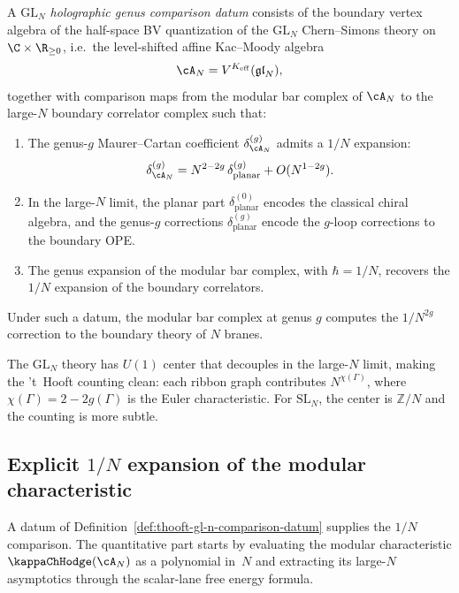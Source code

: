 \begin{definition}%
\label{def:thooft-gl-n-comparison-datum}

A \emph{$\mathrm{GL}_N$ holographic genus comparison datum} consists
of the boundary vertex algebra of the half-space BV
quantization of the $\mathrm{GL}_N$ Chern--Simons theory on
$\C \times \R_{\ge 0}$, i.e.\ the level-shifted affine Kac--Moody
algebra
\[
\cA_N=V^{K_{\mathrm{eff}}}(\mathfrak{gl}_N),
\]
together with comparison maps from the modular bar complex of $\cA_N$
to the large-$N$ boundary correlator complex such that:
\begin{enumerate}[label=\textup{(\alph*)}]
\item The genus-$g$ Maurer--Cartan coefficient
 $\delta_{\cA_N}^{(g)}$ admits a $1/N$ expansion:
 \[
 \delta_{\cA_N}^{(g)} = N^{2-2g}\, \delta_{\mathrm{planar}}^{(g)}
 + O(N^{1-2g}).
 \]
\item In the large-$N$ limit, the planar part
 $\delta_{\mathrm{planar}}^{(0)}$ encodes the classical
 chiral algebra, and the genus-$g$ corrections
 $\delta_{\mathrm{planar}}^{(g)}$ encode the $g$-loop
 corrections to the boundary OPE.
\item The genus expansion of the modular bar complex, with
 $\hbar = 1/N$, recovers the $1/N$ expansion of the boundary
 correlators.
\end{enumerate}
Under such a datum, the modular bar complex at genus $g$ computes the
$1/N^{2g}$ correction to the boundary theory of $N$ branes.
\end{definition}

\begin{remark}
The $\mathrm{GL}_N$ theory has $U(1)$ center that decouples in the
large-$N$ limit, making the 't~Hooft counting clean: each
ribbon graph contributes $N^{\chi(\Gamma)}$, where
$\chi(\Gamma) = 2 - 2g(\Gamma)$ is the Euler characteristic.
For $\mathrm{SL}_N$, the center is $\mathbb{Z}/N$ and the counting is more
subtle.
\end{remark}

\subsection{Explicit $1/N$ expansion of the modular characteristic}
\label{subsec:1overN-modular-characteristic}

A datum of Definition~\ref{def:thooft-gl-n-comparison-datum} supplies
the $1/N$ comparison. The quantitative part starts by evaluating the modular characteristic
$\kappaChHodge(\cA_N)$ as a polynomial in~$N$ and extracting its large-$N$
asymptotics through the scalar-lane free energy formula.

